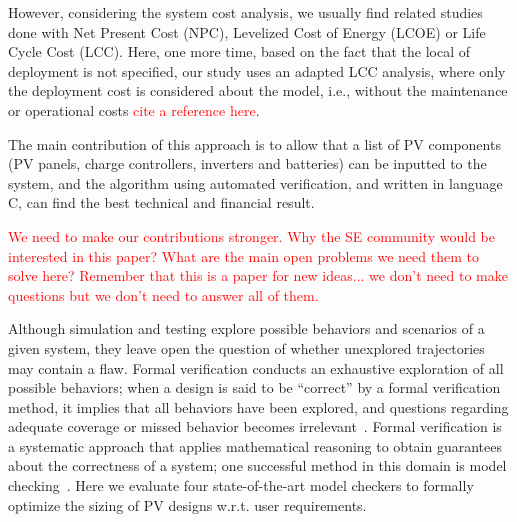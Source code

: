 \documentclass[10pt,conference]{IEEEtran}
\begin{document}
However, considering the system cost analysis, we usually find related studies done with Net Present Cost (NPC), Levelized Cost of Energy (LCOE) or Life Cycle Cost (LCC). Here, one more time, based on the fact that the local of deployment is not specified, our study uses an adapted LCC analysis, where only the deployment cost is considered about the model, i.e., without the maintenance or operational costs \textcolor{red}{cite a reference here}.

The main contribution of this approach is to allow that a list of PV components (PV panels, charge controllers, inverters and batteries) can be inputted to the system, and the algorithm using automated verification, and written in language C, can find the best technical and financial result.

\textcolor{red}{We need to make our contributions stronger. Why the SE community would be interested in this paper? What are the main open problems we need them to solve here? Remember that this is a paper for new ideas... we don't need to make questions but we don't need to answer all of them.}


\label{sec:AutomatedVerification}
Although simulation and testing explore possible behaviors and scenarios of a given system, they leave open the question of whether unexplored trajectories may contain a flaw. Formal verification conducts an exhaustive exploration of all possible behaviors; when a design is said to be ``correct'' by a formal verification method, it implies that all behaviors have been explored, and questions regarding adequate coverage or missed behavior becomes irrelevant~\cite{Clarke2012}. Formal verification is a systematic approach that applies mathematical reasoning to obtain guarantees about the correctness of a system; one successful method in this domain is model checking~\cite{Clarke2012}. Here we evaluate four state-of-the-art model checkers to formally optimize the sizing of PV designs w.r.t. user requirements.

\end{document}
